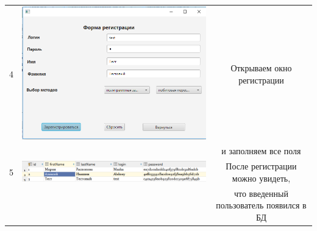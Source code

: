 \documentclass[a4paper,12pt]{article}
\begin{document}
\begin{table}[h]
\begin{tabular}{|c|c|c|}
	4 & \includegraphics[scale=0.3]{img/database/before_registry_form.png} & Открываем окно регистрации \\ && и заполняем все поля\\
	\hline 
	5 & \includegraphics[scale=0.3]{img/database/after_registry_user.png} & После регистрации можно увидеть, \\ && что введенный пользователь появился в БД\\
	\hline
\end{tabular} 
\label{table:data_type1} 
\end{table}
\end{document}
